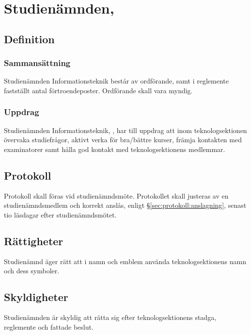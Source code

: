 \section{Studienämnden, \SNIT}

\subsection{Definition}

\subsubsection{Sammansättning}
Studienämnden Informationsteknik består av ordförande, samt i reglemente fastställt antal förtroendeposter. Ordförande skall vara myndig.

\subsubsection{Uppdrag}
Studienämnden Informationsteknik, \SNIT{}, har till uppdrag att inom teknologsektionen övervaka studiefrågor, aktivt verka för bra/bättre kurser, främja kontakten med examinatorer samt hålla god kontakt med teknologsektionens medlemmar.

\subsection{Protokoll}
Protokoll skall föras vid studienämndsmöte. Protokollet skall justeras av en studienämndsmedlem och korrekt anslås, enligt §\ref{sec:protokoll:anslagning}, senast tio läsdagar efter studienämndsmötet.

\subsection{Rättigheter}
Studienämnd äger rätt att i namn och emblem använda teknologsektionens namn och dess symboler.

\subsection{Skyldigheter}
Studienämnden är skyldig att rätta sig efter teknologsektionens stadga, reglemente och fattade beslut.